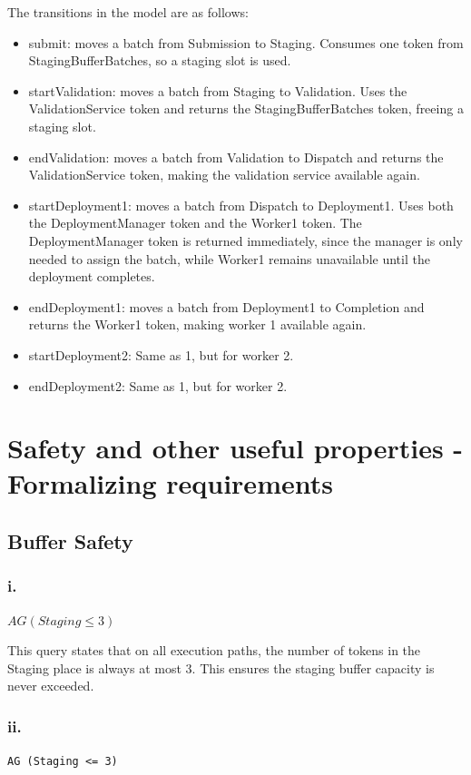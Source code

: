 The transitions in the model are as follows:
\begin{itemize}
    \item submit: moves a batch from Submission to Staging. Consumes one
    token from StagingBufferBatches, so a staging slot is used.
    \item startValidation: moves a batch from Staging to Validation. Uses the 
    ValidationService token and returns the StagingBufferBatches token, 
    freeing a staging slot.
    \item endValidation: moves a batch from Validation to Dispatch and returns
    the ValidationService token, making the validation service available again.
    \item startDeployment1: moves a batch from Dispatch to Deployment1. Uses both the DeploymentManager token and the Worker1 token. The
    DeploymentManager token is returned immediately, since the manager is only
    needed to assign the batch, while Worker1 remains unavailable until the
    deployment completes.
    \item endDeployment1: moves a batch from Deployment1 to Completion and
    returns the Worker1 token, making worker 1 available again.
    \item startDeployment2: Same as 1, but for worker 2.
    \item endDeployment2: Same as 1, but for worker 2.
\end{itemize}

\section{Safety and other useful properties - Formalizing requirements}
\subsection{Buffer Safety}

\subsubsection*{i.}
\(
AG(Staging \leq 3)
\)

This query states that on all execution paths, the number of tokens in the 
Staging place is always at most 3. This ensures the staging buffer
capacity is never exceeded.

\subsubsection*{ii.}
\texttt{AG (Staging <= 3)}

